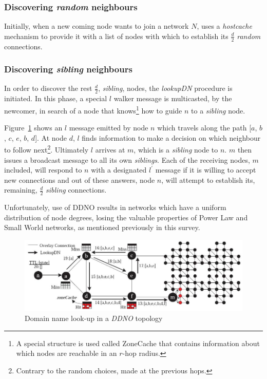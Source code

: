 \documentclass[a4paper,10pt]{article}
\begin{document}
\subsubsection*{Discovering \emph{random} neighbours}
Initially, when a new coming node wants to join a network $N$, uses a \emph{hostcache} mechanism to provide it with a list of nodes with which to establish its $\frac{d}{2}$ \emph{random} connections.

\subsubsection*{Discovering \emph{sibling} neighbours}
In order to discover the rest $\frac{d}{2}$, \emph{sibling}, nodes, the \emph{lookupDN} procedure is initiated. In this phase, a special $l$ walker message is multicasted, by the newcomer, in search of a node that knows\footnote{A special structure is used called ZoneCache that contains information about which nodes are reachable in an $r$-hop radius.} how to guide $n$ to a \emph{sibling} node.

Figure~\ref{figure:ddno_lookupdn} shows an $l$ message emitted by node $n$ which travels along the path [$a$, $b$, $c$, $e$, $b$, $d$]. At node $d$, $l$ finds information to make a decision on which neighbour to follow next\footnote{Contrary to the random choices, made at the previous hops.}. Ultimately $l$ arrives at $m$, which is a \emph{sibling} node to $n$. $m$ then issues a broadcast message to all its own \emph{siblings}. Each of the receiving nodes, $m$ included, will respond to $n$ with a designated $l^{'}$ message if it is willing to accept new connections and out of these answers, node $n$, will attempt to establish its, remaining, $\frac{d}{2}$ \emph{sibling} connections.

Unfortunately, use of DDNO results in networks which have a uniform distribution of node degrees, losing the valuable properties of Power Law and Small World networks, as mentioned previously in this survey.

\begin{figure}
\centering
  \includegraphics[scale=0.375]{img/ddno_lookupdn.jpeg}
\caption{Domain name look-up in a \emph{DDNO} topology}
\label{figure:ddno_lookupdn}
\end{figure}
\end{document}
